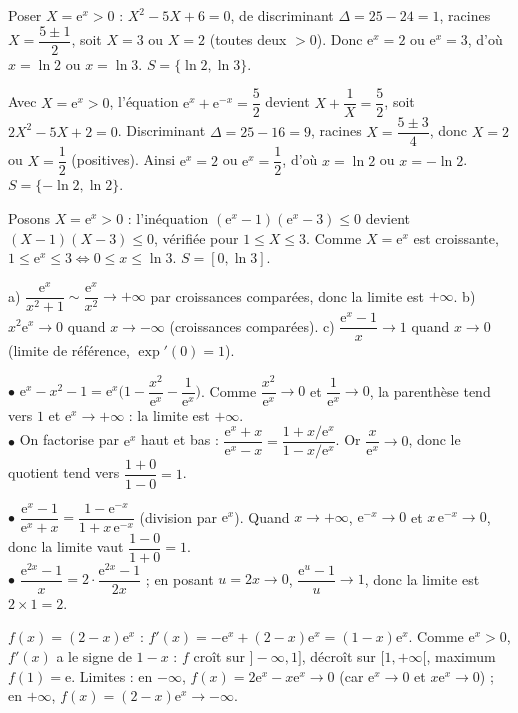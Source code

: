 Poser $X=\mathrm{e}^{x}>0$ : $X^{2}-5X+6=0$, de discriminant $\Delta=25-24=1$, racines
$X=\dfrac{5\pm1}{2}$, soit $X=3$ ou $X=2$ (toutes deux $>0$). Donc $\mathrm{e}^{x}=2$ ou
$\mathrm{e}^{x}=3$, d'où $x=\ln 2$ ou $x=\ln 3$. \;$S=\{\ln 2,\ln 3\}$.

Avec $X=\mathrm{e}^{x}>0$, l'équation $\mathrm{e}^{x}+\mathrm{e}^{-x}=\dfrac52$ devient
$X+\dfrac1X=\dfrac52$, soit $2X^{2}-5X+2=0$. Discriminant $\Delta=25-16=9$, racines
$X=\dfrac{5\pm3}{4}$, donc $X=2$ ou $X=\dfrac12$ (positives). Ainsi $\mathrm{e}^{x}=2$ ou
$\mathrm{e}^{x}=\dfrac12$, d'où $x=\ln 2$ ou $x=-\ln 2$. \;$S=\{-\ln 2,\ln 2\}$.

Posons $X=\mathrm{e}^{x}>0$ : l'inéquation $(\mathrm{e}^{x}-1)(\mathrm{e}^{x}-3)\le0$ devient
$(X-1)(X-3)\le0$, vérifiée pour $1\le X\le3$. Comme $X=\mathrm{e}^{x}$ est croissante,
$1\le\mathrm{e}^{x}\le3\iff 0\le x\le\ln 3$. \;$S=[0,\ln 3]$.

a) $\dfrac{\mathrm{e}^{x}}{x^{2}+1}\sim\dfrac{\mathrm{e}^{x}}{x^{2}}\to+\infty$ par croissances
comparées, donc la limite est $+\infty$. \quad
b) $x^{2}\mathrm{e}^{x}\to 0$ quand $x\to-\infty$ (croissances comparées). \quad
c) $\dfrac{\mathrm{e}^{x}-1}{x}\to 1$ quand $x\to0$ (limite de référence, $\exp'(0)=1$).

$\bullet$ $\mathrm{e}^{x}-x^{2}-1=\mathrm{e}^{x}\Big(1-\dfrac{x^{2}}{\mathrm{e}^{x}}-\dfrac1{\mathrm{e}^{x}}\Big)$.
Comme $\dfrac{x^{2}}{\mathrm{e}^{x}}\to0$ et $\dfrac1{\mathrm{e}^{x}}\to0$, la parenthèse tend
vers $1$ et $\mathrm{e}^{x}\to+\infty$ : la limite est $+\infty$.\\
$\bullet$ On factorise par $\mathrm{e}^{x}$ haut et bas :
$\dfrac{\mathrm{e}^{x}+x}{\mathrm{e}^{x}-x}=\dfrac{1+x/\mathrm{e}^{x}}{1-x/\mathrm{e}^{x}}$. Or
$\dfrac{x}{\mathrm{e}^{x}}\to0$, donc le quotient tend vers $\dfrac{1+0}{1-0}=1$.

$\bullet$ $\dfrac{\mathrm{e}^{x}-1}{\mathrm{e}^{x}+x}=\dfrac{1-\mathrm{e}^{-x}}{1+x\,\mathrm{e}^{-x}}$
(division par $\mathrm{e}^{x}$). Quand $x\to+\infty$, $\mathrm{e}^{-x}\to0$ et
$x\,\mathrm{e}^{-x}\to0$, donc la limite vaut $\dfrac{1-0}{1+0}=1$.\\
$\bullet$ $\dfrac{\mathrm{e}^{2x}-1}{x}=2\cdot\dfrac{\mathrm{e}^{2x}-1}{2x}$ ; en posant $u=2x\to0$,
$\dfrac{\mathrm{e}^{u}-1}{u}\to1$, donc la limite est $2\times1=2$.

$f(x)=(2-x)\mathrm{e}^{x}$ : $f'(x)=-\mathrm{e}^{x}+(2-x)\mathrm{e}^{x}=(1-x)\mathrm{e}^{x}$.
Comme $\mathrm{e}^{x}>0$, $f'(x)$ a le signe de $1-x$ : $f$ croît sur $]-\infty,1]$, décroît sur
$[1,+\infty[$, maximum $f(1)=\mathrm{e}$.
Limites : en $-\infty$, $f(x)=2\mathrm{e}^{x}-x\mathrm{e}^{x}\to 0$ (car $\mathrm{e}^{x}\to0$ et
$x\mathrm{e}^{x}\to0$) ; en $+\infty$, $f(x)=(2-x)\mathrm{e}^{x}\to-\infty$.

